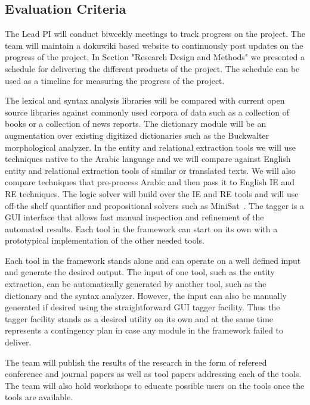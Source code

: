 \documentclass[12pt]{article}
\begin{document}
\subsection{Evaluation Criteria}

The Lead PI will conduct biweekly meetings to track progress on the project.
 The team will maintain a dokuwiki based website to continuously post updates on the progress of the project.
 In Section "Research Design and Methods" we presented a schedule for delivering the different products of the project.
 The schedule can be used as a timeline for measuring the progress of the project.

The lexical and syntax analysis libraries will be compared with current open source libraries against commonly used corpora of data such as a collection of books or a collection of news reports.
 The dictionary module will be an augmentation over existing digitized dictionaries such as the Buckwalter~\cite{Tim04} morphological analyzer.
 In the entity and relational extraction tools we will use techniques native to the Arabic language and we will compare against English entity and relational extraction tools of similar or translated texts.
 We will also compare techniques that pre-process Arabic and then pass it to English IE and RE techniques.
 The logic solver will build over the IE and RE tools and will use off-the shelf quantifier and propositional solvers such as MiniSat~\cite{Een03}.
 The tagger is a GUI interface that allows fast manual inspection and refinement of the automated results.
 Each tool in the framework can start on its own with a prototypical implementation of the other needed tools.
 
Each tool in the framework stands alone and can operate on a well defined input and generate the desired output.
 The input of one tool, such as the entity extraction, can be automatically generated by another tool, such as the dictionary and the syntax analyzer.
  However, the input can also be manually generated if desired using the straightforward GUI tagger facility.
 Thus the tagger facility stands as a desired utility on its own and at the same time represents a contingency plan in case any module in the framework failed to deliver.
 
The team will publish the results of the research in the form of refereed conference and journal papers as well as tool papers addressing each of the tools.
 The team will also hold workshops to educate possible users on the tools once the tools are available.
\end{document}
